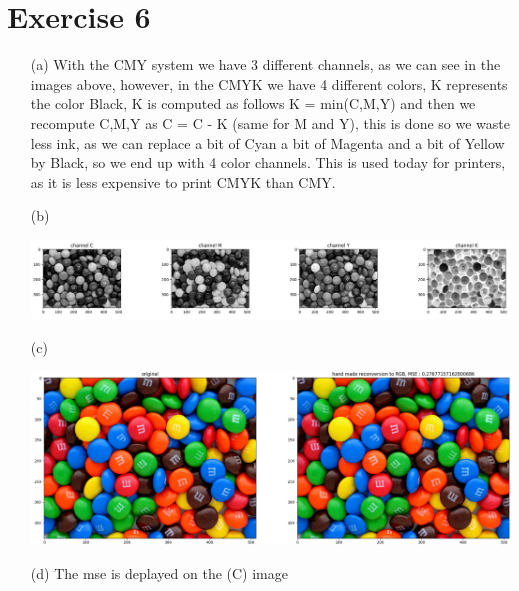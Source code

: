 \documentclass[a4paper]{article}
\begin{document}
\section*{Exercise 6}
\begin{itemize}
\item[(a)] With the CMY system we have 3 different channels, as we can see in the images above, however, in the CMYK we have 4 different colors, K represents the color Black, K is computed as follows K = min(C,M,Y) and then we recompute C,M,Y as C = C - K (same for M and Y), this is done so we waste less ink, as we can replace a bit of Cyan a bit of Magenta and a bit of Yellow by Black, so we end up with 4 color channels. This is used today for printers, as it is less expensive to print CMYK than CMY.
\item[(b)]
\begin{center}
\includegraphics[width=1\textwidth]{images/exercice_6_b.PNG}\\[1cm] 
\end{center}
\item[(c)]
\begin{center}
\includegraphics[width=1\textwidth]{images/exercice_6_c.PNG}\\[1cm] 
\end{center}
\item[(d)] The mse is deplayed on the (C) image 
\end{itemize}

\end{document}
